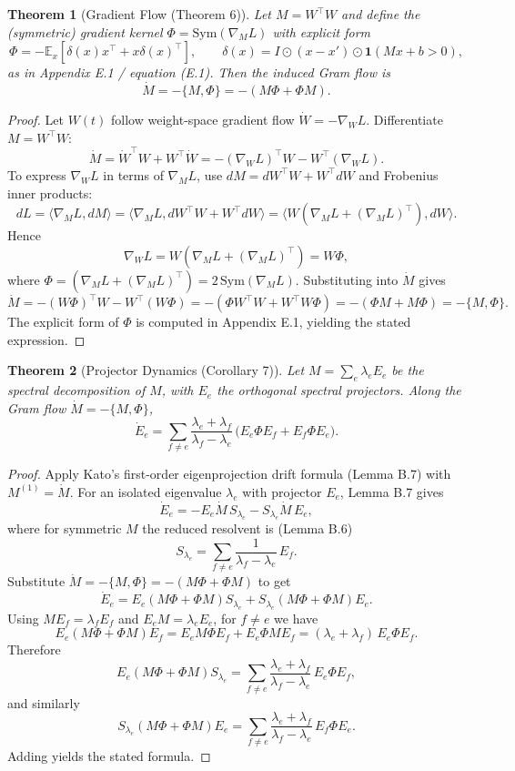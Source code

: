 \documentclass{article}
\theoremstyle{plain}
\newtheorem{theorem}{Theorem}
\numberwithin{equation}{section}
\theoremstyle{definition}
\theoremstyle{remark}
\begin{document}
\begin{lemmaproofbox}
\begin{theorem}[Gradient Flow (Theorem 6)]
Let $M=W^\top W$ and define the (symmetric) gradient kernel $\Phi=\mathrm{Sym}(\nabla_M L)$ with explicit form
\[
\Phi = -\mathbb E_x[\delta(x)x^\top + x\delta(x)^\top],
\qquad
\delta(x)= I\odot (x-x')\odot \mathbf 1(Mx+b>0),
\]
as in Appendix E.1 / equation (E.1). Then the induced Gram flow is
\[
\dot M = -\{M,\Phi\}=-(M\Phi+\Phi M).
\]
\end{theorem}
\begin{proof}
Let $W(t)$ follow weight-space gradient flow $\dot W=-\nabla_W L$. Differentiate $M=W^\top W$:
\[
\dot M = \dot W^\top W + W^\top \dot W
= -(\nabla_W L)^\top W - W^\top (\nabla_W L).
\]
To express $\nabla_W L$ in terms of $\nabla_M L$, use $dM=dW^\top W + W^\top dW$ and Frobenius inner products:
\[
dL=\langle \nabla_M L, dM\rangle
=\langle \nabla_M L, dW^\top W + W^\top dW\rangle
=\langle W(\nabla_M L + (\nabla_M L)^\top), dW\rangle.
\]
Hence
\[
\nabla_W L = W(\nabla_M L + (\nabla_M L)^\top)=W\Phi,
\]
where $\Phi=(\nabla_M L+(\nabla_M L)^\top)=2\,\mathrm{Sym}(\nabla_M L)$.
Substituting into $\dot M$ gives
\[
\dot M = -(W\Phi)^\top W - W^\top(W\Phi)
=-(\Phi W^\top W + W^\top W\Phi)
=-(\Phi M + M\Phi)
=-\{M,\Phi\}.
\]
The explicit form of $\Phi$ is computed in Appendix E.1, yielding the stated expression.
\end{proof}
\end{lemmaproofbox}


\begin{lemmaproofbox}
\begin{theorem}[Projector Dynamics (Corollary 7)]
Let $M=\sum_e \lambda_e E_e$ be the spectral decomposition of $M$, with $E_e$ the orthogonal spectral projectors.
Along the Gram flow $\dot M=-\{M,\Phi\}$,
\[
\dot E_e
= \sum_{f\neq e}\frac{\lambda_e+\lambda_f}{\lambda_f-\lambda_e}\,\big(E_e\Phi E_f + E_f\Phi E_e\big).
\]
\end{theorem}
\begin{proof}
Apply Kato's first-order eigenprojection drift formula (Lemma B.7) with $M^{(1)}=\dot M$.
For an isolated eigenvalue $\lambda_e$ with projector $E_e$, Lemma B.7 gives
\[
\dot E_e = -E_e \dot M\, S_{\lambda_e} - S_{\lambda_e}\dot M\, E_e,
\]
where for symmetric $M$ the reduced resolvent is (Lemma B.6)
\[
S_{\lambda_e}=\sum_{f\neq e}\frac{1}{\lambda_f-\lambda_e}\,E_f.
\]
Substitute $\dot M=-\{M,\Phi\}=-(M\Phi+\Phi M)$ to get
\[
\dot E_e = E_e(M\Phi+\Phi M)S_{\lambda_e} + S_{\lambda_e}(M\Phi+\Phi M)E_e.
\]
Using $ME_f=\lambda_f E_f$ and $E_eM=\lambda_e E_e$, for $f\neq e$ we have
\[
E_e(M\Phi+\Phi M)E_f
=E_eM\Phi E_f + E_e\Phi M E_f
=(\lambda_e+\lambda_f)\,E_e\Phi E_f.
\]
Therefore
\[
E_e(M\Phi+\Phi M)S_{\lambda_e}
=\sum_{f\neq e}\frac{\lambda_e+\lambda_f}{\lambda_f-\lambda_e}\,E_e\Phi E_f,
\]
and similarly
\[
S_{\lambda_e}(M\Phi+\Phi M)E_e
=\sum_{f\neq e}\frac{\lambda_e+\lambda_f}{\lambda_f-\lambda_e}\,E_f\Phi E_e.
\]
Adding yields the stated formula.
\end{proof}
\end{lemmaproofbox}
\end{document}
